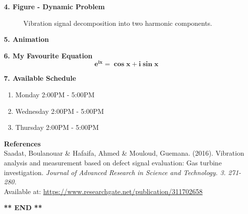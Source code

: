 \documentclass[12pt,a4paper]{article}
\begin{document}
\newpage

\textbf{4. Figure - Dynamic Problem}
\begin{figure} [h]
  \begin{center}
    \caption{Vibration signal decomposition into two harmonic components.}
    \label{image}
  \end{center}
\end{figure}
\bigskip

\textbf{5. Animation}

\bigskip

\textbf{6. My Favourite Equation}
\begin{equation}
  \mathbf{e}^\mathbf{ix} = \mathbf{\cos{x}} + \mathbf{i \sin{x}}
\end{equation}
\bigskip

\textbf{7. Available Schedule}
\begin{enumerate}
  \item Monday 2:00PM - 5:00PM
  \item Wednesday 2:00PM - 5:00PM
  \item Thursday 2:00PM - 5:00PM
\end{enumerate}
\bigskip

\noindent \textbf{References}\\
\noindent [\ref{image}] Saadat, Boulanouar \& Hafaifa, Ahmed \& Mouloud, Guemana. (2016).
Vibration analysis and measurement based on defect signal evaluation: Gas turbine investigation.
\textit{Journal of Advanced Research in Science and Technology. 3. 271-280.}\\
Available at: \href{https://www.researchgate.net/publication/311702658_Vibration_analysis_and_measurement_based_on_defect_signal_evaluation_Gas_turbine_investigation}{https://www.researchgate.net/publication/311702658}
\bigskip

\begin{center}
  \textbf{** END **}
\end{center}
\end{document}
